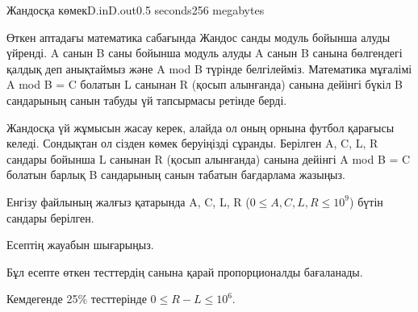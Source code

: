 \begin{problem}{Жандосқа көмек}{D.in}{D.out}{0.5 seconds}{256 megabytes}

Өткен аптадағы математика сабағында Жандос санды модуль бойынша алуды үйренді. A санын B саны бойынша модуль алуды A санын B санына бөлгендегі қалдық деп анықтаймыз және A mod B түрінде белгілейміз. Математика мұғалімі A mod B = C болатын L санынан R (қосып алынғанда) санына дейінгі бүкіл B сандарының санын табуды үй тапсырмасы ретінде берді.

Жандосқа үй жұмысын жасау керек, алайда ол оның орнына футбол қарағысы келеді.
Сондықтан ол сізден көмек беруіңізді сұранды. Берілген A, C, L, R сандары бойынша L санынан R (қосып алынғанда) санына дейінгі A mod B = C болатын барлық B сандарының санын табатын бағдарлама жазыңыз.


\InputFile
Енгізу файлының жалғыз қатарында A, C, L, R ($0 \le A, C, L, R \le 10^9$) бүтін сандары берілген.


\OutputFile
Есептің жауабын шығарыңыз.

\Examples

\begin{example}
%
%
\end{example}

\Note
\Scoring

Бұл есепте өткен тесттердің санына қарай пропорционалды бағаланады.

Кемдегенде 25\% тесттерінде $0 \le R - L \le 10^6$.


\end{problem}
